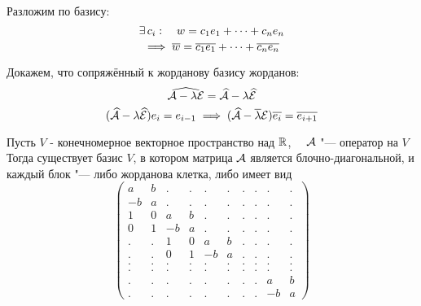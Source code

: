 \begin{lemma}
\begin{enumerate}
\begin{iproof}
			Разложим по базису:
			$$ \exists\, c_i : \quad w = c_1e_1 + \dots + c_ne_n $$
			$$ \implies \overline{w} = \overline{c_1}\overline{e_1} + \dots + \overline{c_n}\overline{e_n} $$
			\item Докажем, что сопряжённый к жорданову базису жорданов:
			$$ \widehat{\mathcal{A} - \lambda \mathcal{E}} = \widehat{\mathcal{A}} - \lambda \widehat{\mathcal{E}} $$
			$$ (\widehat{\mathcal{A}} - \lambda \widehat{\mathcal{E}})e_i = e_{i - 1} \implies (\widehat{\mathcal{A}} - \overline{\lambda}\mathcal{E})\overline{e_i} = \overline{e_{i + 1}} $$
		\end{iproof}
	\end{enumerate}
\end{lemma}

\begin{theorem}
	Пусть $ V $ - конечномерное векторное пространство над $ \mathbb{R} $, $ \quad \mathcal{A} $ "--- оператор на $ V $ \\
	Тогда существует базис $ V $, в котором матрица $ \mathcal{A} $ является блочно-диагональной, и каждый блок "--- либо жорданова клетка, либо имеет вид
	$$
	\begin{pmatrix}
		a & b & . & . & . & . & . & . & . & . \\
		-b & a & . & . & . & . & . & . & . & . \\
		1 & 0 & a & b & . & . & . & . & . & . \\
		0 & 1 & -b & a & . & . & . & . & . & . \\
		. & . & 1 & 0 & a & b & . & . & . & . \\
		. & . & 0 & 1 & -b & a & . & . & . & . \\
		. & . & . & . & . & . & . & . & . & . \\
		. & . & . & . & . & . & . & . & . & . \\
		. & . & . & . & . & . & . & . & a & b \\
		. & . & . & . & . & . & . & . & -b & a
	\end{pmatrix} $$
\end{theorem}

